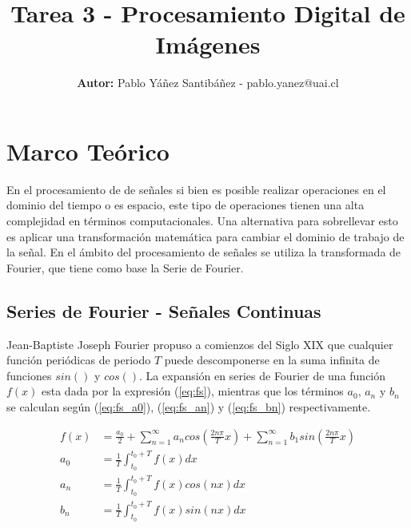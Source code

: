 \documentclass[
  letterpaper,
  twocolumn,
  9pt,
  journal,
  final]{IEEEtran}
\title{Tarea 3 - Procesamiento Digital de Imágenes}
\author{\textbf{Autor:} Pablo Yáñez Santibáñez - pablo.yanez@uai.cl}
\begin{document}
\maketitle


\tableofcontents



\section{Marco Teórico}

En el procesamiento de de señales si bien es posible realizar operaciones en el dominio del tiempo o es espacio, este tipo de operaciones tienen una alta complejidad en términos computacionales. Una alternativa para sobrellevar esto es aplicar una transformación matemática para cambiar el dominio de trabajo de la señal. En el ámbito del procesamiento de señales se utiliza la transformada de Fourier, que tiene como base la Serie de Fourier.

\subsection{Series de Fourier - Señales Continuas}

Jean-Baptiste Joseph Fourier propuso a comienzos del Siglo XIX que cualquier función periódicas de periodo $T$ puede descomponerse en la suma infinita de funciones $sin()$ y $cos()$. La expansión en series de Fourier de una función $f(x)$ esta dada por la expresión (\ref{eq:fs}), mientras que los términos $a_0$, $a_n$ y $b_n$ se calculan según (\ref{eq:fs_a0}), (\ref{eq:fs_an}) y (\ref{eq:fs_bn}) respectivamente.




\begin{align}
	f(x) &= \frac{a_0}{2} + \sum_{n=1}^{\infty} a_n cos \left(\frac{2n\pi}{T}x\right) + \sum_{n=1}^{\infty} b_1 sin\left(\frac{2n\pi}{T}x\right) \label{eq:fs} \\
	a_0 &= \frac{1}{T} \int_{t_0}^{t_0 + T} f(x) dx \label{eq:fs_a0} \\
	a_n &= \frac{1}{T} \int_{t_0}^{t_0 + T} f(x) cos(nx) dx \label{eq:fs_an}\\
	b_n &= \frac{1}{T} \int_{t_0}^{t_0 + T} f(x) sin(nx) dx \label{eq:fs_bn}
\end{align}
\end{document}
